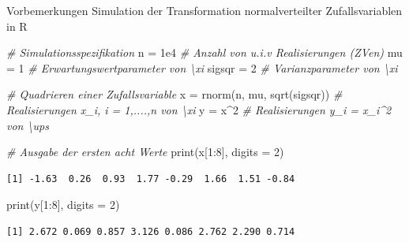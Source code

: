 \documentclass[
  8pt,
  ignorenonframetext,
]{beamer}
\newenvironment{Shaded}{\begin{snugshade}}{\end{snugshade}}
\newcommand{\AttributeTok}[1]{\textcolor[rgb]{0.77,0.63,0.00}{#1}}
\newcommand{\CommentTok}[1]{\textcolor[rgb]{0.56,0.35,0.01}{\textit{#1}}}
\newcommand{\DecValTok}[1]{\textcolor[rgb]{0.00,0.00,0.81}{#1}}
\newcommand{\FloatTok}[1]{\textcolor[rgb]{0.00,0.00,0.81}{#1}}
\newcommand{\FunctionTok}[1]{\textcolor[rgb]{0.00,0.00,0.00}{#1}}
\newcommand{\NormalTok}[1]{#1}
\newcommand{\OtherTok}[1]{\textcolor[rgb]{0.56,0.35,0.01}{#1}}
\newcommand{\SpecialCharTok}[1]{\textcolor[rgb]{0.00,0.00,0.00}{#1}}
\begin{document}
\begin{frame}[fragile]{Vorbemerkungen}
\protect\hypertarget{vorbemerkungen-3}{}
Simulation der Transformation normalverteilter Zufallsvariablen in R

\vspace{2mm}
\footnotesize

\begin{Shaded}
\begin{Highlighting}[]
\CommentTok{\# Simulationsspezifikation}
\NormalTok{n       }\OtherTok{=} \FloatTok{1e4}                          \CommentTok{\# Anzahl von u.i.v Realisierungen (ZVen)}
\NormalTok{mu      }\OtherTok{=} \DecValTok{1}                            \CommentTok{\# Erwartungswertparameter von \textbackslash{}xi}
\NormalTok{sigsqr  }\OtherTok{=} \DecValTok{2}                            \CommentTok{\# Varianzparameter von \textbackslash{}xi}

\CommentTok{\# Quadrieren einer Zufallsvariable}
\NormalTok{x       }\OtherTok{=} \FunctionTok{rnorm}\NormalTok{(n, mu, }\FunctionTok{sqrt}\NormalTok{(sigsqr))   }\CommentTok{\# Realisierungen x\_i, i = 1,....,n von \textbackslash{}xi}
\NormalTok{y       }\OtherTok{=}\NormalTok{ x}\SpecialCharTok{\^{}}\DecValTok{2}                          \CommentTok{\# Realisierungen y\_i = x\_i\^{}2 von \textbackslash{}ups}

\CommentTok{\# Ausgabe der ersten acht Werte}
\FunctionTok{print}\NormalTok{(x[}\DecValTok{1}\SpecialCharTok{:}\DecValTok{8}\NormalTok{], }\AttributeTok{digits =} \DecValTok{2}\NormalTok{)}
\end{Highlighting}
\end{Shaded}

\begin{verbatim}
[1] -1.63  0.26  0.93  1.77 -0.29  1.66  1.51 -0.84
\end{verbatim}

\begin{Shaded}
\begin{Highlighting}[]
\FunctionTok{print}\NormalTok{(y[}\DecValTok{1}\SpecialCharTok{:}\DecValTok{8}\NormalTok{], }\AttributeTok{digits =} \DecValTok{2}\NormalTok{)}
\end{Highlighting}
\end{Shaded}

\begin{verbatim}
[1] 2.672 0.069 0.857 3.126 0.086 2.762 2.290 0.714
\end{verbatim}
\end{frame}
\end{document}
